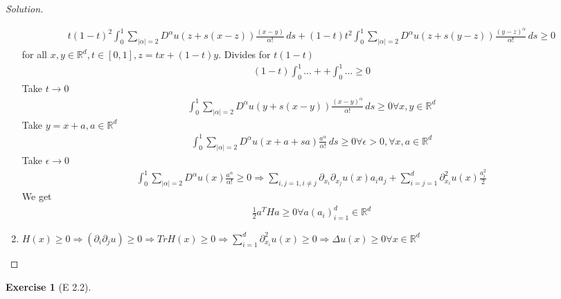 \documentclass{report}
\theoremstyle{tommy}
\newtheorem{ex}[defn]{Exercise}
\begin{document}
\begin{proof}[Solution]
\begin{enumerate}[label=\alph*]
      \begin{align*}
        t(1-t)^2 \int_0^1 \sum_{|\alpha| = 2} D^\alpha u(z + s(x-z)) \frac{(x-y)}{\alpha!} \, ds + (1-t) t^2 \int_0^1 \sum_{|\alpha| = 2} D^\alpha u(z + s(y-z)) \frac{(y-z)^\alpha}{\alpha!} \,ds \ge 0
      \end{align*}
      for all \(x,y \in \mathbb{R}^d, t \in [0,1], z = tx+ (1-t)y\). Divides for \(t(1-t)\)
      \begin{align*}
        (1-t) \int_0^1 \dots + + \int_0^1 \dots \ge 0
      \end{align*}
      Take \(t \to 0\)
      \begin{align*}
        \int_0^1 \sum_{|\alpha| = 2} D^\alpha u(y + s(x-y)) \frac{(x-y)^\alpha}{\alpha!} \, ds \ge 0 \forall x,y \in \mathbb{R}^d
      \end{align*}
      Take \(y = x +a, a \in \mathbb{R}^d\)
      \begin{align*}
        \int_0^1 \sum_{|\alpha| = 2} D^\alpha u(x +a+sa) \frac{a^\alpha}{\alpha!} \, ds \ge 0 \forall \epsilon > 0, \forall x,a \in \mathbb{R}^d
      \end{align*}
      Take \(\epsilon \to 0\)
      \begin{align*}
        \int_0^1 \sum_{|\alpha| = 2} D^\alpha u(x) \frac{a^\alpha}{\alpha!} \ge 0 \Rightarrow \sum_{i,j = 1, i \ne j}\partial_{x_i} \partial_{x_j} u(x) a_i a_j + \sum_{i=j=1}^d \partial_{x_i}^2 u(x) \frac{a_i^2}{2}
      \end{align*}
      We get
      \begin{align*}
        \frac{1}{2} a^T Ha \ge 0 \forall a(a_i)_{i=1}^d \in \mathbb{R}^d
      \end{align*}
      \item \(H(x) \ge 0 \Rightarrow \left(\partial_i \partial_j u\right) \ge 0 \Rightarrow Tr H(x) \ge 0 \Rightarrow \sum_{i=1}^d \partial_{x_i}^2 u(x) \ge 0 \Rightarrow \Delta u(x) \ge 0 \forall x \in \mathbb{R}^d\)
    \end{enumerate}
  \end{proof}

  
  \begin{ex}[E 2.2]
    
  \end{ex}
\end{document}
